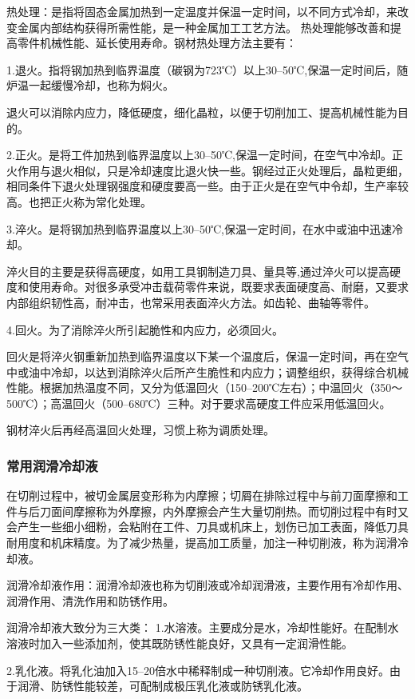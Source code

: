\documentclass{ctexbook}
\begin{document}
热处理：是指将固态金属加热到一定温度并保温一定时间，以不同方式冷却，来改变金属内部结构获得所需性能，是一种金属加工工艺方法。
热处理能够改善和提高零件机械性能、延长使用寿命。钢材热处理方法主要有：

1.退火。指将钢加热到临界温度（碳钢为723℃）以上30--50℃,保温一定时间后，随炉温一起缓慢冷却，也称为焖火。

退火可以消除内应力，降低硬度，细化晶粒，以便于切削加工、提高机械性能为目的。

2.正火。是将工件加热到临界温度以上30--50℃,保温一定时间，在空气中冷却。正火作用与退火相似，只是冷却速度比退火快一些。钢经过正火处理后，晶粒更细，相同条件下退火处理钢强度和硬度要高一些。由于正火是在空气中令却，生产率较高。也把正火称为常化处理。

3.淬火。是将钢加热到临界温度以上30--50℃,保温一定时间，在水中或油中迅速冷却。

淬火目的主要是获得高硬度，如用工具钢制造刀具、量具等,通过淬火可以提高硬度和使用寿命。对很多承受冲击载荷零件来说，既要求表面硬度高、耐磨，又要求内部组织韧性高，耐冲击，也常采用表面淬火方法。如齿轮、曲轴等零件。

4.回火。为了消除淬火所引起脆性和内应力，必须回火。

回火是将淬火钢重新加热到临界温度以下某一个温度后，保温一定时间，再在空气中或油中冷却，以达到消除淬火后所产生脆性和内应力；调整组织，获得综合机械性能。根据加热温度不同，又分为低温回火（150--200℃左右）；中温回火（350〜500℃）；高温回火（500--680℃）三种。对于要求高硬度工件应采用低温回火。

钢材淬火后再经高温回火处理，习惯上称为调质处理。

\subsubsection{常用润滑冷却液}
在切削过程中，被切金属层变形称为内摩擦；切屑在排除过程中与前刀面摩擦和工件与后刀面间摩擦称为外摩擦，内外摩擦会产生大量切削热。而切削过程中有时又会产生一些细小细粉，会粘附在工件、刀具或机床上，划伤已加工表面，降低刀具耐用度和机床精度。为了减少热量，提高加工质量，加注一种切削液，称为润滑冷却液。

润滑冷却液作用：润滑冷却液也称为切削液或冷却润滑液，主要作用有冷却作用、润滑作用、清洗作用和防锈作用。

润滑冷却液大致分为三大类：
1.水溶液。主要成分是水，冷却性能好。在配制水溶液时加入一些添加剂，使其既防锈性能良好，又具有一定润滑性能。

2.乳化液。将乳化油加入15--20倍水中稀释制成一种切削液。它冷却作用良好。由于润滑、防锈性能较差，可配制成极压乳化液或防锈乳化液。
\end{document}

